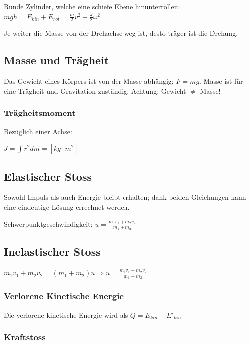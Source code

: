 \documentclass[a4paper]{scrartcl}
\begin{document}
	Runde Zylinder, welche eine schiefe Ebene hinunterrollen: $mgh = E_{kin} + E_{rot} =\frac{m}{2} v^2 + \frac{J}{2} \omega^2$
	
	Je weiter die Masse von der Drehachse weg ist, desto träger ist die Drehung.
	

\subsection{Masse und Trägheit}
	Das Gewicht eines Körpers ist von der Masse abhängig: $F = mg$.
	Masse ist für eine Trägheit und Gravitation zuständig. Achtung: Gewicht $\neq$ Masse!



\subsubsection{Trägheitsmoment}

	
	Bezüglich einer Achse:
	
	$J = \int r^2 d m = \left[ kg \cdot m^2 \right]$

\subsection{Elastischer Stoss}
	Sowohl Impuls als auch Energie bleibt erhalten; dank beiden Gleichungen kann eine eindeutige Lösung errechnet werden.
	
	Schwerpunktgeschwindigkeit: $u = \frac{m_1 v_1 + m_2 v_2}{m_1 + m_2}$ %


\subsection{Inelastischer Stoss}

	$m_1 v_1 + m_2 v_2 = (m_1 + m_2) u \Rightarrow u = \frac{m_1 v_1 + m_2 v_2}{m_1 + m_2}$

\subsubsection{Verlorene Kinetische Energie}

	Die verlorene kinetische Energie wird als $Q = E_{kin}  - E'_{kin}$

\subsubsection{Kraftstoss}
\end{document}
